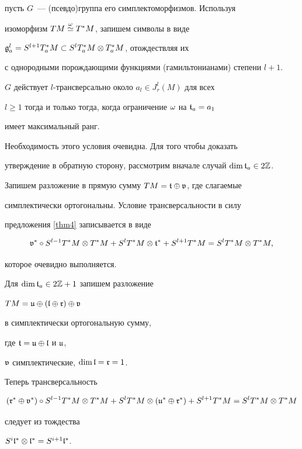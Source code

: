 пусть $G$~--- (псевдо)группа его симплектоморфизмов. Используя


изоморфизм $TM\overset{\omega}{\simeq}{} T^*M$, запишем символы в виде


${\frak g}^l_a=S^{l+1}T^*_aM\subset S^lT^*_aM\otimes T^*_aM$, отождествляя их


с однородными порождающими функциями (гамильтонианами) степени $l+1$.





\begin{prop}\label{symplpro}


$G$ действует $l$-трансверсально около $a_l\in J^l_r(M)$ для всех


$l\ge1$ тогда и только тогда, когда ограничение $\omega$ на ${\frak t}_a=a_1$


имеет максимальный ранг.


\end{prop}





\begin{pf}


Необходимость этого условия очевидна. Для того чтобы доказать


утверждение в обратную сторону, рассмотрим вначале случай $\dim{\frak t}_a\in2{\Bbb Z}$.


Запишем разложение в прямую сумму $TM={\frak t}\oplus{\frak v}$, где слагаемые


симплектически ортогональны. Условие трансверсальности в силу


предложения \ref{thm4} записывается в виде


$$


\vg^*\circ S^{l-1}T^*M\ot T^*M+ S^lT^*M\ot\tf^*+ S^{l+1}T^*M = S^lT^*M\ot


T^*M,


$$


которое очевидно выполняется.





Для $\dim{\frak t}_a\in2{\Bbb Z}+1$ запишем разложение


$TM=\frak{u}\oplus(\frak{l}\oplus\frak{r})\oplus\frak{v}$


в симплектически ортогональную сумму,


где ${\frak t}=\frak{u}\oplus\frak{l}$ и $\frak{u}$,


$\frak{v}$ симплектические, $\dim\frak{l}=\frak{r}=1$.


Теперь трансверсальность


$$


(\frak{r}^*\oplus\frak{v}^*)\circ S^{l-1}T^*M\ot T^*M+


S^lT^*M\ot(\frak{u}^*\oplus\frak{r}^*)+ S^{l+1}T^*M = S^lT^*M\ot T^*M


$$


следует из тождества


$S^i\frak{l}^*\otimes\frak{l}^*=S^{i+1}\frak{l}^*$.


\end{pf}








